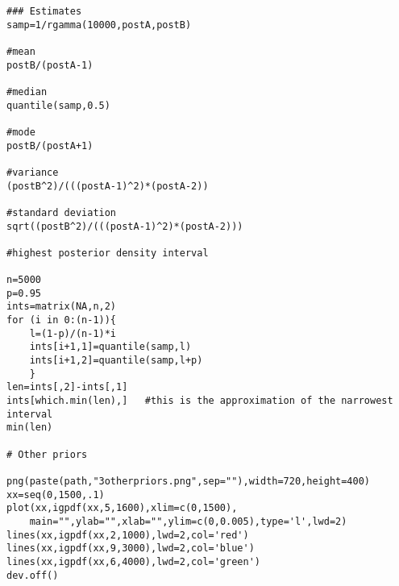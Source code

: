\documentclass[12pt]{article}
\begin{document}
\begin{scriptsize}
\begin{verbatim}
### Estimates
samp=1/rgamma(10000,postA,postB)

#mean
postB/(postA-1)

#median
quantile(samp,0.5)

#mode
postB/(postA+1)

#variance
(postB^2)/(((postA-1)^2)*(postA-2))

#standard deviation
sqrt((postB^2)/(((postA-1)^2)*(postA-2)))

#highest posterior density interval

n=5000
p=0.95
ints=matrix(NA,n,2)
for (i in 0:(n-1)){
    l=(1-p)/(n-1)*i
    ints[i+1,1]=quantile(samp,l)
    ints[i+1,2]=quantile(samp,l+p)
    }
len=ints[,2]-ints[,1]
ints[which.min(len),]	#this is the approximation of the narrowest interval
min(len)

# Other priors

png(paste(path,"3otherpriors.png",sep=""),width=720,height=400)
xx=seq(0,1500,.1)
plot(xx,igpdf(xx,5,1600),xlim=c(0,1500),
    main="",ylab="",xlab="",ylim=c(0,0.005),type='l',lwd=2)
lines(xx,igpdf(xx,2,1000),lwd=2,col='red')
lines(xx,igpdf(xx,9,3000),lwd=2,col='blue')
lines(xx,igpdf(xx,6,4000),lwd=2,col='green')
dev.off()
\end{verbatim}
\end{scriptsize}
\end{document}

